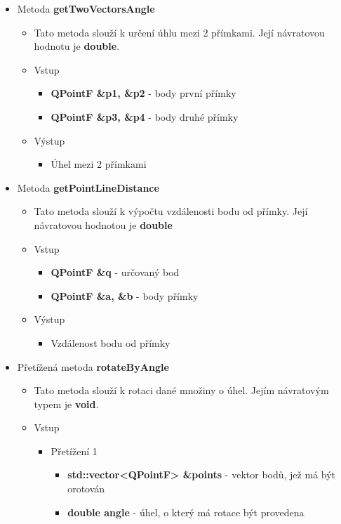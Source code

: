 \documentclass[a4paper, 12pt]{article}
\begin{document}
\begin{itemize}
	\item Metoda \textbf{getTwoVectorsAngle}
		\begin{itemize}
			\item Tato metoda slouží k určení úhlu mezi 2 přímkami. Její návratovou hodnotu je \textbf{double}.
			\item Vstup
				\begin{itemize}
					\item \textbf{QPointF \&p1, \&p2} - body první přímky
					\item \textbf{QPointF \&p3, \&p4} - body druhé přímky
				\end{itemize}
		
			\item Výstup
				\begin{itemize}
					\item Úhel mezi 2 přímkami
				\end{itemize}			
		\end{itemize}

	\item Metoda \textbf{getPointLineDistance}
		\begin{itemize}
			\item Tato metoda slouží k výpočtu vzdálenosti bodu od přímky. Její návratovou hodnotou je \textbf {double} %
			\item Vstup
				\begin{itemize}
					\item \textbf{QPointF \&q} - určovaný bod
					\item \textbf{QPointF \&a, \&b} - body přímky
				\end{itemize}
			\item Výstup
				\begin{itemize}
					\item Vzdálenost bodu od přímky
				\end{itemize}
		\end{itemize}

	\item Přetížená metoda \textbf{rotateByAngle}
		\begin{itemize}
			\item Tato metoda slouží k rotaci dané množiny o úhel. Jejím návratovým typem je \textbf{void}.
			\item Vstup
				\begin{itemize}
					\item Přetížení 1
						\begin{itemize}
							\item \textbf{std::vector<QPointF> \&points} - vektor bodů, jež má být orotován
							\item \textbf{double angle} - úhel, o který má rotace být provedena
 						\end{itemize}
					

\end{itemize}
\end{itemize}
\end{itemize}
\end{document}
